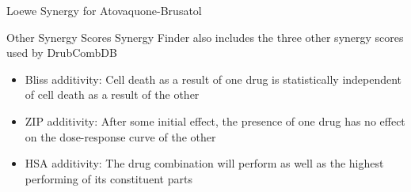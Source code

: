 \documentclass{beamer}
\begin{document}
\begin{frame}{Loewe Synergy for Atovaquone-Brusatol}
    \centering
\end{frame}

\begin{frame}{Other Synergy Scores}
    Synergy Finder also includes the three other synergy scores used by DrubCombDB
    \begin{itemize}
        \item Bliss additivity: Cell death as a result of one drug is statistically independent of cell death as a result of the other
        \item ZIP additivity: After some initial effect, the presence of one drug has no effect on the dose-response curve of the other
        \item HSA additivity: The drug combination will perform as well as the highest performing of its constituent parts
    \end{itemize}
\end{frame}
\end{document}
